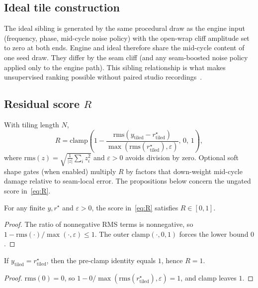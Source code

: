 \subsection{Ideal tile construction}
\label{sec:ideal-tile}

The ideal sibling is generated by the same procedural draw as the engine input (frequency, phase, mid-cycle noise policy) with the open-wrap cliff amplitude set to zero at both ends.
Engine and ideal therefore share the mid-cycle content of one seed draw.
They differ by the seam cliff (and any seam-boosted noise policy applied only to the engine path).
This sibling relationship is what makes unsupervised ranking possible without paired studio recordings~\cite{lehtinen2018,kashyap2021n2n}.

\subsection{Residual score $R$}
\label{sec:residual-score}

With tiling length $N$,
\begin{equation}
\label{eq:R}
R=\mathrm{clamp}\!\left(1-\frac{\mathrm{rms}(y_{\mathrm{tiled}}-r^{\star}_{\mathrm{tiled}})}{\max(\mathrm{rms}(r^{\star}_{\mathrm{tiled}}),\varepsilon)},\,0,\,1\right),
\end{equation}
where $\mathrm{rms}(z)=\sqrt{\frac{1}{|z|}\sum_i z_i^2}$ and $\varepsilon>0$ avoids division by zero.
Optional soft shape gates (when enabled) multiply $R$ by factors that down-weight mid-cycle damage relative to seam-local error. The propositions below concern the ungated score in~\eqref{eq:R}.

\begin{proposition}[Range]
\label{prop:r-range}
For any finite $y,r^{\star}$ and $\varepsilon>0$, the score in~\eqref{eq:R} satisfies $R\in[0,1]$.
\end{proposition}
\begin{proof}
The ratio of nonnegative RMS terms is nonnegative, so $1-\mathrm{rms}(\cdot)/\max(\cdot,\varepsilon)\le 1$.
The outer $\mathrm{clamp}(\cdot,0,1)$ forces the lower bound $0$.
\end{proof}

\begin{proposition}
\label{prop:perfect}
If $y_{\mathrm{tiled}}=r^{\star}_{\mathrm{tiled}}$, then the pre-clamp identity equals $1$, hence $R=1$.
\end{proposition}
\begin{proof}
$\mathrm{rms}(0)=0$, so $1-0/\max(\mathrm{rms}(r^{\star}_{\mathrm{tiled}}),\varepsilon)=1$, and clamp leaves $1$.
\end{proof}

